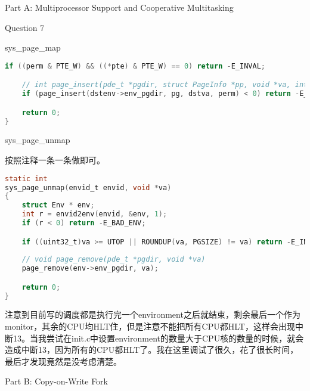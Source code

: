 \documentclass[GBK,winfonts,a4paper,10pt]{ctexart}
\begin{document}
\begin{section}{Part A: Multiprocessor Support and Cooperative Multitasking}
\begin{subsection}{Question 7}
\begin{subsubsection}{sys\_page\_map}
\begin{lstlisting}[language=C]
	if ((perm & PTE_W) && ((*pte) & PTE_W) == 0) return -E_INVAL;

	// int page_insert(pde_t *pgdir, struct PageInfo *pp, void *va, int perm)
	if (page_insert(dstenv->env_pgdir, pg, dstva, perm) < 0) return -E_NO_MEM;

	return 0;
}
\end{lstlisting}
\end{subsubsection}

\begin{subsubsection}{sys\_page\_unmap}
\par
按照注释一条一条做即可。
\begin{lstlisting}[language=C]
static int
sys_page_unmap(envid_t envid, void *va)
{
	struct Env * env;
	int r = envid2env(envid, &env, 1);
	if (r < 0) return -E_BAD_ENV;

	if ((uint32_t)va >= UTOP || ROUNDUP(va, PGSIZE) != va) return -E_INVAL;
	
	// void page_remove(pde_t *pgdir, void *va)
	page_remove(env->env_pgdir, va);

	return 0;
}
\end{lstlisting}	
\end{subsubsection}

\par
注意到目前写的调度都是执行完一个environment之后就结束，剩余最后一个作为monitor，其余的CPU均HLT住，但是注意不能把所有CPU都HLT，这样会出现中断13。当我尝试在init.c中设置environment的数量大于CPU核的数量的时候，就会造成中断13，因为所有的CPU都HLT了。我在这里调试了很久，花了很长时间，最后才发现竟然是没考虑清楚。
\end{subsection}

\end{section}

\begin{section}{Part B: Copy-on-Write Fork}
\end{section}
\end{document}

